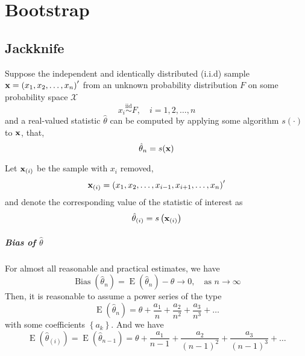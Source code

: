 \chapter{Bootstrap}

\section{Jackknife}

Suppose the independent and identically distributed (i.i.d) sample ${\bf x}=\left(x_{1},x_{2},\ldots,x_{n}\right)^{\prime}$ from an unknown probability distribution $F$ on some probability space $\mathcal{X}$
\begin{equation}
	x_{i}\stackrel{\text{iid}}{\sim}F,\quad i=1,2,\ldots,n
\end{equation}
and a real-valued statistic $\hat{\theta}$ can be computed by applying some algorithm $s(\cdot)$ to ${\bf x}$, that,
\begin{equation}
	\hat{\theta}_{n}=s({\bf x})
\end{equation}

Let ${\bf x}_{(i)}$ be the sample with $x_{i}$ removed,
\begin{equation}
	{\bf x}_{(i)}=\left(x_{1},x_{2},\ldots,x_{i-1},x_{i+1},\ldots,x_{n}\right)^{\prime}
\end{equation}
and denote the corresponding value of the statistic of interest as
\begin{equation}
	\hat{\theta}_{(i)}=s\left({\bf x}_{(i)}\right)
\end{equation}

\paragraph{Bias of $\hat{\theta}$}

For almost all reasonable and practical estimates, we have \begin{equation}
	\operatorname{Bias}(\hat{\theta}_{n})=\operatorname{E}(\hat{\theta}_{n})-\theta\rightarrow 0,\quad\text{as }n\rightarrow\infty
\end{equation}
Then, it is reasonable to assume a power series of the type
\begin{equation}
	\operatorname{E}(\hat{\theta}_{n})=\theta+\frac{a_{1}}{n}+\frac{a_{2}}{n^{2}}+\frac{a_{3}}{n^{3}}+\ldots
\end{equation}
with some coefficients $\left\{a_{k}\right\}$. And we have
\begin{equation}
	\operatorname{E}(\hat{\theta}_{(i)})=\operatorname{E}(\hat{\theta}_{n-1})=\theta+\frac{a_{1}}{n-1}+\frac{a_{2}}{\left(n-1\right)^{2}}+\frac{a_{3}}{\left(n-1\right)^{3}}+\ldots
\end{equation}

